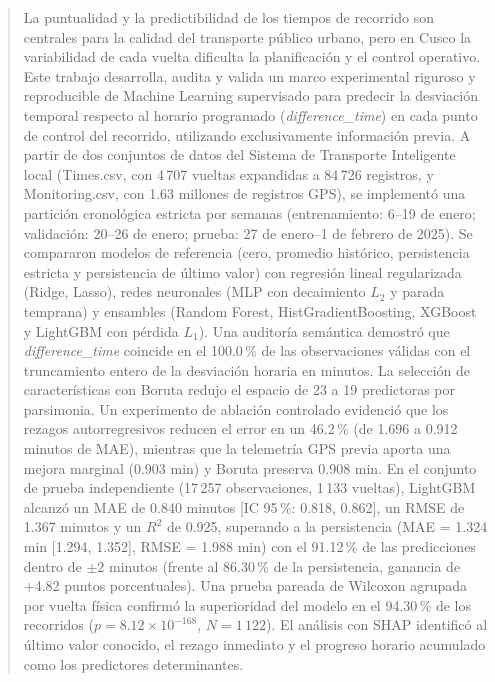\documentclass[conference]{IEEEtran}
\begin{document}
\begin{abstract}
La puntualidad y la predictibilidad de los tiempos de recorrido son centrales para la calidad del transporte público urbano, pero en Cusco la variabilidad de cada vuelta dificulta la planificación y el control operativo. Este trabajo desarrolla, audita y valida un marco experimental riguroso y reproducible de Machine Learning supervisado para predecir la desviación temporal respecto al horario programado (\textit{difference\_time}) en cada punto de control del recorrido, utilizando exclusivamente información previa. A partir de dos conjuntos de datos del Sistema de Transporte Inteligente local (Times.csv, con 4\,707 vueltas expandidas a 84\,726 registros, y Monitoring.csv, con 1.63 millones de registros GPS), se implementó una partición cronológica estricta por semanas (entrenamiento: 6--19 de enero; validación: 20--26 de enero; prueba: 27 de enero--1 de febrero de 2025). Se compararon modelos de referencia (cero, promedio histórico, persistencia estricta y persistencia de último valor) con regresión lineal regularizada (Ridge, Lasso), redes neuronales (MLP con decaimiento $L_2$ y parada temprana) y ensambles (Random Forest, HistGradientBoosting, XGBoost y LightGBM con pérdida $L_1$). Una auditoría semántica demostró que \textit{difference\_time} coincide en el 100.0\,\% de las observaciones válidas con el truncamiento entero de la desviación horaria en minutos. La selección de características con Boruta redujo el espacio de 23 a 19 predictoras por parsimonia. Un experimento de ablación controlado evidenció que los rezagos autorregresivos reducen el error en un 46.2\,\% (de 1.696 a 0.912 minutos de MAE), mientras que la telemetría GPS previa aporta una mejora marginal (0.903 min) y Boruta preserva 0.908 min. En el conjunto de prueba independiente (17\,257 observaciones, 1\,133 vueltas), LightGBM alcanzó un MAE de 0.840 minutos [IC 95\,\%: 0.818, 0.862], un RMSE de 1.367 minutos y un $R^2$ de 0.925, superando a la persistencia (MAE = 1.324 min [1.294, 1.352], RMSE = 1.988 min) con el 91.12\,\% de las predicciones dentro de $\pm 2$ minutos (frente al 86.30\,\% de la persistencia, ganancia de +4.82 puntos porcentuales). Una prueba pareada de Wilcoxon agrupada por vuelta física confirmó la superioridad del modelo en el 94.30\,\% de los recorridos ($p = 8.12 \times 10^{-168}$, $N = 1\,122$). El análisis con SHAP identificó al último valor conocido, el rezago inmediato y el progreso horario acumulado como los predictores determinantes.
\end{abstract}
\end{document}
